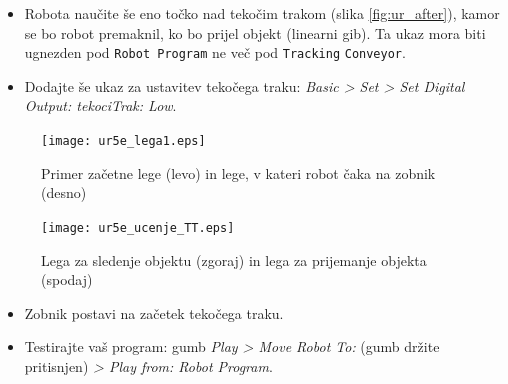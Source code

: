 \begin{mdframed}[backgroundcolor=yellow!20, shadow=true,roundcorner=8pt]
\begin{itemize}
  \begin{itemize}
      \item Dodajte še ukaz \emph{Wait}, da robot počaka 2 sekundi, preden pobere objekt.
      \item Sedaj morate robota naučiti še dve legi:
      \begin{itemize}
        \item lego nad objektom, v kateri bo robot sledil objektu (robot je postavljen nad zobnik, slika \ref{fig:ur_ucenje_TT} zgoraj);
        \item lego prijemanja objekta, kjer premaknete robota do vrha zobnika (slika \ref{fig:ur_ucenje_TT} spodaj).
      \end{itemize}
      Ti dve legi naučite, ko je objekt na tekočem traku v poziciji, ko ravno prekine laserski žarek (takrat začne robot slediti objektu). Pri tem uporabite linearni gib s hitrostjo 100~mm/s.
      \item Dodajte še ukaz za zaprtje prijemala (nastavitve \emph{Position}: 85~\%, \emph{Speed}: 50~\%, \emph{Force}: 30~\%).
  \end{itemize}
  \item Robota naučite še eno točko nad tekočim trakom (slika \ref{fig:ur_after}), kamor se bo robot premaknil, ko bo prijel objekt (linearni gib). Ta ukaz mora biti ugnezden pod \verb"Robot Program" ne več pod \verb"Tracking" \verb"Conveyor".
  \item Dodajte še ukaz za ustavitev tekočega traku: \emph{Basic > Set > Set Digital Output: tekociTrak: Low}.
 \end{itemize}
\end{mdframed}

   \begin{figure}[!htb]
\centering
 \texttt{[image: ur5e\_lega1.eps]}
\caption{Primer začetne lege (levo) in lege, v kateri robot čaka na zobnik (desno)}
\label{fig:ur_lega1}
\end{figure}

   \begin{figure}[!htb]
\centering
 \texttt{[image: ur5e\_ucenje\_TT.eps]}
\caption{Lega za sledenje objektu (zgoraj) in lega za prijemanje objekta (spodaj)}
\label{fig:ur_ucenje_TT}
\end{figure}



  \begin{mdframed}[backgroundcolor=yellow!20, shadow=true,roundcorner=8pt]
\begin{itemize}
    \item Zobnik postavi na začetek tekočega traku.
  \item Testirajte vaš program: gumb \emph{Play > Move Robot To:} (gumb držite pritisnjen) \emph{> Play from: Robot Program}.
\end{itemize}
\end{mdframed}



